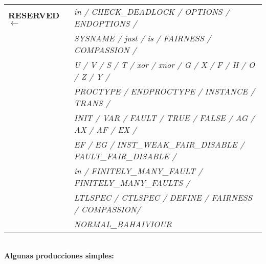 \documentclass[titlepage, 12pt]{book}
\begin{document}
\begin{tabular}{>{\bfseries}l>{\itshape}l}
RESERVED $\longleftarrow$ & in / CHECK\_DEADLOCK / OPTIONS / ENDOPTIONS / \\
		  				  & SYSNAME / just / is / FAIRNESS / COMPASSION / \\
						  &	U / V / S / T / xor / xnor / G / X / F / H / O / Z / Y /\\
						  &	PROCTYPE / ENDPROCTYPE / INSTANCE / TRANS /\\
				          &	INIT / VAR / FAULT / TRUE / FALSE / AG / AX / AF / EX /\\
						  &	EF / EG / INST\_WEAK\_FAIR\_DISABLE / FAULT\_FAIR\_DISABLE /\\
					  	  &	in / FINITELY\_MANY\_FAULT / FINITELY\_MANY\_FAULTS /\\
   				          &	LTLSPEC / CTLSPEC / DEFINE / FAIRNESS / COMPASSION/\\
   				          & NORMAL\_BAHAIVIOUR\\
\end{tabular}
~\\

\textbf{Algunas producciones simples:}\\
\end{document}
